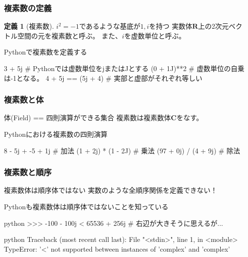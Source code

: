 \documentclass[dvipdfmx,11pt,notheorems]{beamer}
\theoremstyle{definition}
\newtheorem{definition}{定義}
\begin{document}
\begin{frame}[fragile]\frametitle{複素数の定義}

\begin{definition}[複素数]
$i^{2}=-1$であるような基底が$1, i$を持つ
実数体$\mathbf{R}$上の2次元ベクトル空間の元を複素数と呼ぶ。
また、$i$を虚数単位と呼ぶ。
\end{definition}

\begin{exampleblock}{Pythonで複素数を定義する}
\begin{pyconsole}
3 + 5j # Pythonでは虚数単位をjまたはJとする
(0 + 1J)**2 # 虚数単位の自乗は-1となる。
4 + 5j == (5j + 4) # 実部と虚部がそれぞれ等しい
\end{pyconsole}
\end{exampleblock}

\end{frame}

\begin{frame}[fragile]\frametitle{複素数と体}

\begin{block}{体(Field) == 四則演算ができる集合}
複素数は複素数体$\mathbf{C}$をなす。
\end{block}

\begin{exampleblock}{Pythonにおける複素数の四則演算}
\begin{pyconsole}
8 - 5j + -5 + 1j # 加法
(1 + 2j) * (1 - 2J) # 乗法
(97 + 0j) / (4 + 9j) # 除法
\end{pyconsole}
\end{exampleblock}

\end{frame}

\begin{frame}[fragile]\frametitle{複素数と順序}
\begin{block}{複素数体は順序体ではない}
実数のような全順序関係を定義できない！
\end{block}

\begin{exampleblock}{Pythonも複素数体は順序体ではないことを知っている}
\begin{pygments}{python}
>>> -100 - 100j < 65536 + 256j # 右辺が大きそうに思えるが...
\end{pygments}
\begin{pygments}{python}
Traceback (most recent call last):
  File "<stdin>", line 1, in <module>
TypeError: '<' not supported between 
instances of 'complex' and 'complex'
\end{pygments}
\end{exampleblock}
\end{frame}
\end{document}
